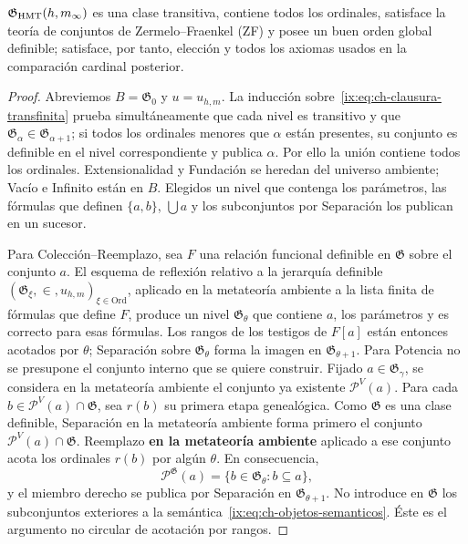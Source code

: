 \begin{lemma}
\label{ix:thm:ch-6b}
\(\mathfrak G_{\rm HMT}(h,m_\infty)\) es una clase transitiva, contiene todos
los ordinales, satisface la teoría de conjuntos de Zermelo--Fraenkel (ZF) y
posee un buen orden global definible; satisface,
por tanto, elección y todos los axiomas usados en la comparación cardinal posterior.

\end{lemma}
\begin{proof}
Abreviemos \(B=\mathfrak G_0\) y \(u=u_{h,m}\). La inducción
sobre~\eqref{ix:eq:ch-clausura-transfinita} prueba simultáneamente que cada nivel es transitivo y que
\(\mathfrak G_\alpha\in\mathfrak G_{\alpha+1}\); si todos los ordinales
menores que \(\alpha\) están presentes, su conjunto es definible en el nivel
correspondiente y publica \(\alpha\). Por ello la unión contiene todos los
ordinales. Extensionalidad y Fundación se heredan del universo ambiente;
Vacío e Infinito están en \(B\). Elegidos un nivel que contenga los parámetros,
las fórmulas que definen \(\{a,b\}\), \(\bigcup a\) y los subconjuntos por
Separación los publican en un sucesor.

Para Colección--Reemplazo, sea \(F\) una relación funcional definible en
\(\mathfrak G\) sobre el conjunto \(a\). El esquema de reflexión relativo a
la jerarquía definible \((\mathfrak G_\xi,\in,u_{h,m})_{\xi\in\mathrm{Ord}}\),
aplicado en la metateoría ambiente a la lista finita de fórmulas que define
\(F\), produce un nivel
\(\mathfrak G_\theta\) que contiene \(a\), los parámetros y es correcto para
esas fórmulas. Los rangos de los testigos de \(F[a]\) están entonces acotados
por \(\theta\); Separación sobre \(\mathfrak G_\theta\) forma la imagen en
\(\mathfrak G_{\theta+1}\). Para Potencia no se presupone el conjunto interno
que se quiere construir. Fijado \(a\in\mathfrak G_\gamma\), se considera en
la metateoría ambiente el conjunto ya existente \(\mathcal P^V(a)\). Para
cada \(b\in\mathcal P^V(a)\cap\mathfrak G\), sea \(r(b)\) su primera etapa
genealógica. Como \(\mathfrak G\) es una clase definible, Separación en la
metateoría ambiente forma primero el conjunto
\(\mathcal P^V(a)\cap\mathfrak G\). Reemplazo \textbf{en la metateoría ambiente}
aplicado a ese conjunto acota los ordinales \(r(b)\) por algún \(\theta\).
En consecuencia,
\[
 \mathcal P^{\mathfrak G}(a)
 =\{b\in\mathfrak G_\theta:b\subseteq a\},
\]
y el miembro derecho se publica por Separación en
\(\mathfrak G_{\theta+1}\). No introduce en \(\mathfrak G\) los subconjuntos
exteriores a la semántica~\eqref{ix:eq:ch-objetos-semanticos}. Éste es el argumento no circular de
acotación por rangos.


\end{proof}
